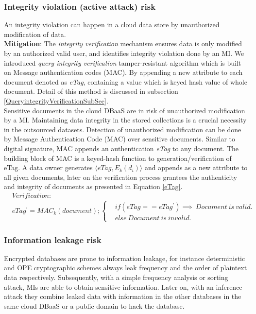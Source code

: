 \subsubsection*{Integrity violation (active attack) risk}
\label{subsec:IntegrityViolation}
An integrity violation can happen in a cloud data store by unauthorized modification of data.\\
\textbf{Mitigation}: The \emph{integrity verification} mechanism ensures data is only modified by an authorized valid user, and identifies integrity violation done by an  MI. We introduced \emph{query integrity verification} tamper-resistant algorithm which is built on Message authentication codes (MAC). By appending a new attribute to each document denoted as \emph{eTag}, containing a value which is keyed hash value of whole document. Detail of this method is discussed in subsection \ref{QueryintegrityVerificationSubSec}.\\

Sensitive documents in the cloud DBaaS are in risk of unauthorized modification by a MI. Maintaining data integrity in the stored collections is a crucial necessity in the outsourced datasets. Detection of unauthorized modification can be done by Message Authentication Code (MAC) over sensitive documents. Similar to digital signature, MAC appends an authentication \textit{eTag} to any document. The building block of MAC is a keyed-hash function to generation/verification of eTag. A data owner generates $\langle eTag, E_k(d_i)\rangle$ and appends as a new attribute to all given documents, later on the verification process grantees the authenticity and integrity of documents as presented in Equation \ref{eTag}.   
\begin{equation}
\label{eTag}
\begin{aligned}
&Verification: \\
&eTag^{'}= MAC_k(document); \begin{cases}
&if (eTag==eTag^{'}) \implies ~ Document~is~valid.\\
&else~ Document~ is~ invalid. 
\end{cases}
\end{aligned}
\end{equation}



\subsubsection*{Information leakage risk}
\label{subsec:InformationLeakageRisk}
Encrypted databases are prone to information leakage, for instance deterministic and OPE cryptographic schemes always leak frequency and the order of plaintext data respectively. Subsequently, with a simple frequency analysis or sorting attack, MIs are able to obtain sensitive information. Later on, with an inference attack they combine leaked data with information in the other databases in the same cloud DBaaS or a public domain to hack the database.
 
